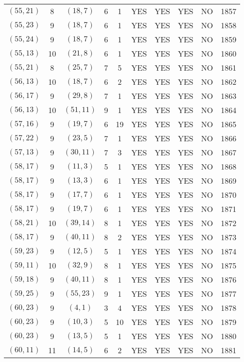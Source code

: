 \begin{longtable}{|c|c|c|c|c|c|c|c|c|c|}
$(55, 21)$ & 8 & $(18, 7)$ & 6 & 1 & YES & YES & YES & NO & 1857\\
$(55, 23)$ & 9 & $(18, 7)$ & 6 & 1 & YES & YES & YES & NO & 1858\\
$(55, 24)$ & 9 & $(18, 7)$ & 6 & 1 & YES & YES & YES & NO & 1859\\
$(55, 13)$ & 10 & $(21, 8)$ & 6 & 1 & YES & YES & YES & NO & 1860\\
$(55, 21)$ & 8 & $(25, 7)$ & 7 & 5 & YES & YES & YES & NO & 1861\\
$(56, 13)$ & 10 & $(18, 7)$ & 6 & 2 & YES & YES & YES & NO & 1862\\
$(56, 17)$ & 9 & $(29, 8)$ & 7 & 1 & YES & YES & YES & NO & 1863\\
$(56, 13)$ & 10 & $(51, 11)$ & 9 & 1 & YES & YES & YES & NO & 1864\\
$(57, 16)$ & 9 & $(19, 7)$ & 6 & 19 & YES & YES & YES & NO & 1865\\
$(57, 22)$ & 9 & $(23, 5)$ & 7 & 1 & YES & YES & YES & NO & 1866\\
$(57, 13)$ & 9 & $(30, 11)$ & 7 & 3 & YES & YES & YES & NO & 1867\\
$(58, 17)$ & 9 & $(11, 3)$ & 5 & 1 & YES & YES & YES & NO & 1868\\
$(58, 17)$ & 9 & $(13, 3)$ & 6 & 1 & YES & YES & YES & NO & 1869\\
$(58, 17)$ & 9 & $(17, 7)$ & 6 & 1 & YES & YES & YES & NO & 1870\\
$(58, 17)$ & 9 & $(19, 7)$ & 6 & 1 & YES & YES & YES & NO & 1871\\
$(58, 21)$ & 10 & $(39, 14)$ & 8 & 1 & YES & YES & YES & NO & 1872\\
$(58, 17)$ & 9 & $(40, 11)$ & 8 & 2 & YES & YES & YES & NO & 1873\\
$(59, 23)$ & 9 & $(12, 5)$ & 5 & 1 & YES & YES & YES & NO & 1874\\
$(59, 11)$ & 10 & $(32, 9)$ & 8 & 1 & YES & YES & YES & NO & 1875\\
$(59, 18)$ & 9 & $(40, 11)$ & 8 & 1 & YES & YES & YES & NO & 1876\\
$(59, 25)$ & 9 & $(55, 23)$ & 9 & 1 & YES & YES & YES & NO & 1877\\
$(60, 23)$ & 9 & $(4, 1)$ & 3 & 4 & YES & YES & YES & NO & 1878\\
$(60, 23)$ & 9 & $(10, 3)$ & 5 & 10 & YES & YES & YES & NO & 1879\\
$(60, 23)$ & 9 & $(13, 5)$ & 5 & 1 & YES & YES & YES & NO & 1880\\
$(60, 11)$ & 11 & $(14, 5)$ & 6 & 2 & YES & YES & YES & NO & 1881\\

\end{longtable}
